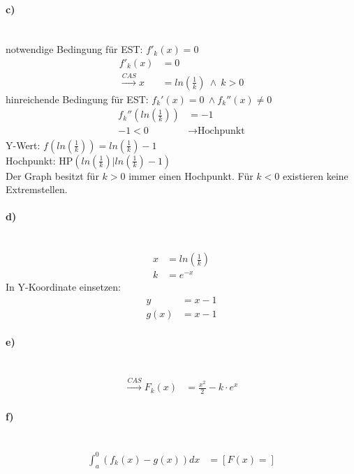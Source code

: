 \documentclass[a4paper, 12pt]{report}
\begin{document}
	\paragraph{c)} \mbox{} \\
	notwendige Bedingung für EST: $f'_k(x) = 0$ \\
	\begin{align*}
		f'_k(x) &= 0 \\
		\xrightarrow{CAS} x &= ln(\frac{1}{k})\ \land\ k > 0
	\end{align*}
	hinreichende Bedingung für EST: $f_k'(x) = 0\ \land f_k''(x) \ne 0$ \\
	\begin{align*}
		f_k''(ln(\frac{1}{k})) &= - 1 \\
		-1 < 0 &\to \text{Hochpunkt}
	\end{align*}
	Y-Wert: $f(ln(\frac{1}{k})) = ln(\frac{1}{k}) - 1$ \\[0.5cm]
	Hochpunkt: $\text{HP}(ln(\frac{1}{k})| ln(\frac{1}{k}) - 1)$ \\
	Der Graph besitzt für $k > 0$ immer einen Hochpunkt. Für $k < 0$ existieren keine Extremstellen.
	
	\paragraph{d)} \mbox{} \\
	\begin{align*}
		x &= ln(\frac{1}{k}) \\
		k &= e^{-x}
	\end{align*}
	In Y-Koordinate einsetzen:
	\begin{align*}
		y &= x - 1 \\
		g(x) &= x - 1
	\end{align*}
	
	\paragraph{e)} \mbox{} \\
	\begin{align*}
		\xrightarrow{CAS} F_k(x) &= \frac{x^2}{2} - k \cdot e^x
	\end{align*}
	\paragraph{f)} \mbox{} \\
	\begin{align*}
		\int_{a}^{0} (f_k(x) - g(x)) dx &= [F(x) = ]
	\end{align*}
	
\end{document}
